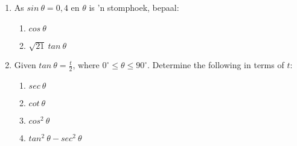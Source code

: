 \begin{exercises}{}
{\begin{enumerate}[itemsep=5pt, label=\textbf{\arabic*}. ]
\item As $sin~\theta= 0,4$ en $\theta$ is 'n stomphoek, bepaal:
\begin{enumerate}[noitemsep, label=\textbf{(\alph*)} ]
 \item $cos~\theta$
\item $\sqrt{21}~tan~\theta$
\end{enumerate}
\item Given $tan~ \theta = \frac{t}{2}$, where $0^{\circ} \leq \theta \leq 90^{\circ}$.
Determine the following in terms of $t$:
\begin{enumerate}[noitemsep, label=\textbf{(\alph*)} ]
\item $sec~ \theta$
\item $cot~ \theta$
\item $cos^2~ \theta$
\item $tan^2~ \theta-sec^2~ \theta$
\end{enumerate}
\end{enumerate}

}
\end{exercises}



